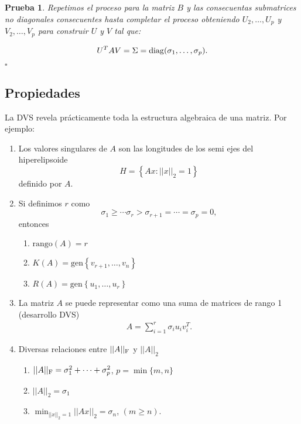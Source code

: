 \documentclass[12pt]{article}
\newtheorem{prb}{Prueba}
\begin{document}
\begin{prb}
Repetimos el proceso para la matriz $B$ y las consecuentas submatrices no diagonales consecuentes hasta completar el proceso obteniendo $U_2, \dots, U_p$ y $V_2, \dots, V_p$ para construir $U$ y $V$ tal que:

$$U^TAV = \Sigma = {\rm diag}(\sigma_1, \ldots, \sigma_p).$$

\hfill $\square$

\end{prb}

\subsection{Propiedades}

La DVS revela pr\'acticamente toda la estructura algebraica de una matriz. Por ejemplo:
\begin{enumerate}
  \item Los valores singulares de $A$ son las longitudes de los semi ejes del hiperelipsoide 
        \[
           H = \left \{ Ax : ||x||_2 =1 \right \}
        \]
         definido por $A$.
  \item Si definimos $r$ como 
  \[
     \sigma_1 \ge \cdots \sigma_r > \sigma_{r+1} = \cdots = \sigma_p = 0,
  \]
  entonces 
    \begin{enumerate}
     \item $\mbox{rango}(A) = r$
     \item $K(A) = \mbox{gen} \left \{ v_{r+1}, \ldots, v_n \right \}$
     \item $R(A) = \mbox{gen} \left \{ u_1, \ldots, u_r \right \}$
    \end{enumerate}
  \item La matriz $A$ se puede representar como una suma de matrices de rango 1 (desarrollo DVS)
         \begin{eqnarray} \label{suma}
            A = \sum_{i=1}^r \sigma_i u_i v_i^T.
         \end{eqnarray}
  \item Diversas relaciones entre  $||A||_{\rm F}$ y $||A||_2$
        \begin{enumerate}
         \item $||A||_{\rm F} = \sigma_1^2 + \cdots + \sigma_p^2$, \quad $p = \min\{m,n\}$
         \item $||A||_2 = \sigma_1$
         \item $\displaystyle{ \min_{||x||_2 = 1} ||Ax||_2 = \sigma_n}$, \quad $(m \ge n)$.
        \end{enumerate}
\end{enumerate}
\end{document}
